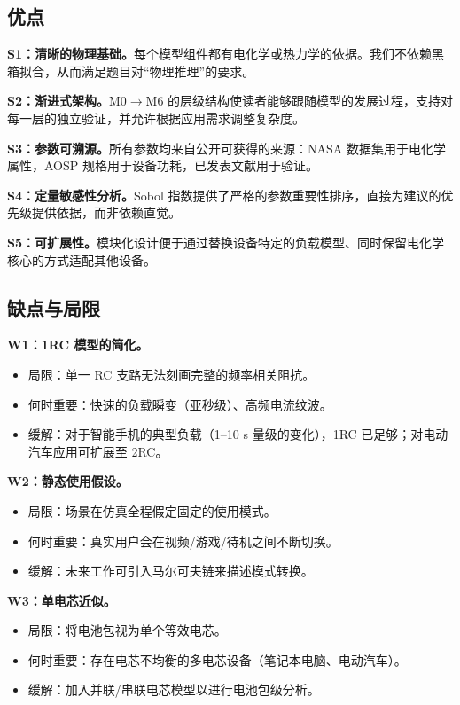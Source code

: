 \documentclass[11pt,a4paper]{ctexart}
\begin{document}
\subsection{优点}

\textbf{S1：清晰的物理基础。}每个模型组件都有电化学或热力学的依据。我们不依赖黑箱拟合，从而满足题目对“物理推理”的要求。

\textbf{S2：渐进式架构。}M0$\to$M6 的层级结构使读者能够跟随模型的发展过程，支持对每一层的独立验证，并允许根据应用需求调整复杂度。

\textbf{S3：参数可溯源。}所有参数均来自公开可获得的来源：NASA 数据集用于电化学属性，AOSP 规格用于设备功耗，已发表文献用于验证。

\textbf{S4：定量敏感性分析。}Sobol 指数提供了严格的参数重要性排序，直接为建议的优先级提供依据，而非依赖直觉。

\textbf{S5：可扩展性。}模块化设计便于通过替换设备特定的负载模型、同时保留电化学核心的方式适配其他设备。

\subsection{缺点与局限}

\textbf{W1：1RC 模型的简化。}
\begin{itemize}[leftmargin=2em]
\item 局限：单一 RC 支路无法刻画完整的频率相关阻抗。
\item 何时重要：快速的负载瞬变（亚秒级）、高频电流纹波。
\item 缓解：对于智能手机的典型负载（1--10 s 量级的变化），1RC 已足够；对电动汽车应用可扩展至 2RC。
\end{itemize}

\textbf{W2：静态使用假设。}
\begin{itemize}[leftmargin=2em]
\item 局限：场景在仿真全程假定固定的使用模式。
\item 何时重要：真实用户会在视频/游戏/待机之间不断切换。
\item 缓解：未来工作可引入马尔可夫链来描述模式转换。
\end{itemize}

\textbf{W3：单电芯近似。}
\begin{itemize}[leftmargin=2em]
\item 局限：将电池包视为单个等效电芯。
\item 何时重要：存在电芯不均衡的多电芯设备（笔记本电脑、电动汽车）。
\item 缓解：加入并联/串联电芯模型以进行电池包级分析。
\end{itemize}
\end{document}
